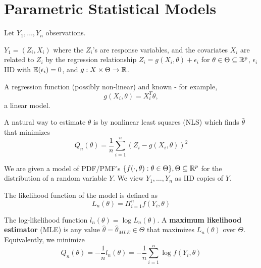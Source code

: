 \chapter{Parametric Statistical Models}
\label{cha:param-stat-models}

Let $Y_{1}, \dots, Y_{n}$ observations.

\begin{exmp}
  \label{defn:parametric_statistical_models:3}
  $Y_{1} = (Z_{i}, X_{i})$ where the $Z_{i}$'s are response variables,
  and the covariates $X_{i}$ are related to $Z_{i}$ by the regression
  relationship $Z_{i} = g(X_{i}, \theta) + \epsilon_{i}$ for $\theta
  \in \Theta \subseteq \mathbb{R}^{p}$, $\epsilon_{i}$ IID with
  $\E{\epsilon_{i}} = 0$, and $g: X \times \Theta \rightarrow \mathbb{R}$.

  A regression function (possibly non-linear) and known - for example,
  \begin{equation}
    \label{eq:14}
    g(X_{i}, \theta) = X_{i}^{T} \theta,
  \end{equation} a linear model.
\end{exmp}


A natural way to estimate $\theta$ is by nonlinear least squares (NLS)
which finds $\hat \theta$ that minimizes
\begin{equation}
  \label{eq:20}
  Q_{n}(\theta) = \frac{1}{n} \sum_{i=1}^{n}(Z_{i}- g(X_{i}, \theta))^{2}
\end{equation}

\begin{exmp}
  \label{defn:parametric_statistical_models:2}
  We are given a model of PDF/PMF's $\{ f(\cdot, \theta): \theta \in
  \Theta \}, \Theta \subseteq \mathbb{R}^{p}$ for the distribution of a random
  variable $Y$.  We view $Y_{1}, \dots, Y_{n}$ as IID copies of $Y$.

  The likelihood function of the model  is defined as
  \begin{equation}
    \label{eq:30}
    L_{n}(\theta) = \Pi_{i=1}^{n} f(Y_{i}, \theta)
  \end{equation}

  The log-likelihood function $l_{n}(\theta) = \log L_{n}(\theta)$.  A
  \textbf{maximum likelihood estimator} (MLE) is any value $\hat
  \theta = \hat \theta_{MLE} \in \Theta$ that maximizes
  $L_{n}(\theta)$ over $\Theta$.  Equivalently, we minimize
  \begin{equation}
    \label{eq:31}
    Q_{n}(\theta) = -\frac{1}{n} l_{n}(\theta) = - \frac{1}{n}
    \sum_{i=1}^{n} \log f(Y_{i}, \theta)
  \end{equation}
\end{exmp}

